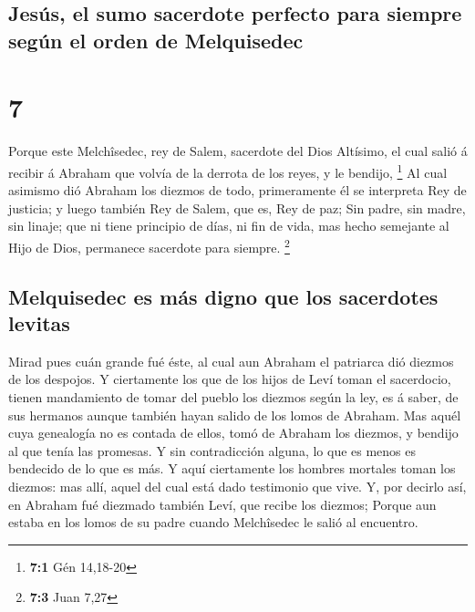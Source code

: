 \hypertarget{jesuxfas-el-sumo-sacerdote-perfecto-para-siempre-seguxfan-el-orden-de-melquisedec}{%
\subsection{Jesús, el sumo sacerdote perfecto para siempre según el
orden de
Melquisedec}\label{jesuxfas-el-sumo-sacerdote-perfecto-para-siempre-seguxfan-el-orden-de-melquisedec}}

\hypertarget{section-6}{%
\section{7}\label{section-6}}

 Porque este Melchîsedec, rey de Salem, sacerdote del Dios
Altísimo, el cual salió á recibir á Abraham que volvía de la derrota de
los reyes, y le bendijo, \footnote{\textbf{7:1} Gén 14,18-20}
 Al cual asimismo dió Abraham los diezmos de todo,
primeramente él se interpreta Rey de justicia; y luego también Rey de
Salem, que es, Rey de paz;  Sin padre, sin madre, sin
linaje; que ni tiene principio de días, ni fin de vida, mas hecho
semejante al Hijo de Dios, permanece sacerdote para siempre. \footnote{\textbf{7:3}
  Juan 7,27}

\hypertarget{melquisedec-es-muxe1s-digno-que-los-sacerdotes-levitas}{%
\subsection{Melquisedec es más digno que los sacerdotes
levitas}\label{melquisedec-es-muxe1s-digno-que-los-sacerdotes-levitas}}

 Mirad pues cuán grande fué éste, al cual aun Abraham el
patriarca dió diezmos de los despojos.  Y ciertamente los
que de los hijos de Leví toman el sacerdocio, tienen mandamiento de
tomar del pueblo los diezmos según la ley, es á saber, de sus hermanos
aunque también hayan salido de los lomos de Abraham.  Mas
aquél cuya genealogía no es contada de ellos, tomó de Abraham los
diezmos, y bendijo al que tenía las promesas.  Y sin
contradicción alguna, lo que es menos es bendecido de lo que es más.
 Y aquí ciertamente los hombres mortales toman los diezmos:
mas allí, aquel del cual está dado testimonio que vive.  Y,
por decirlo así, en Abraham fué diezmado también Leví, que recibe los
diezmos;  Porque aun estaba en los lomos de su padre cuando
Melchîsedec le salió al encuentro.

